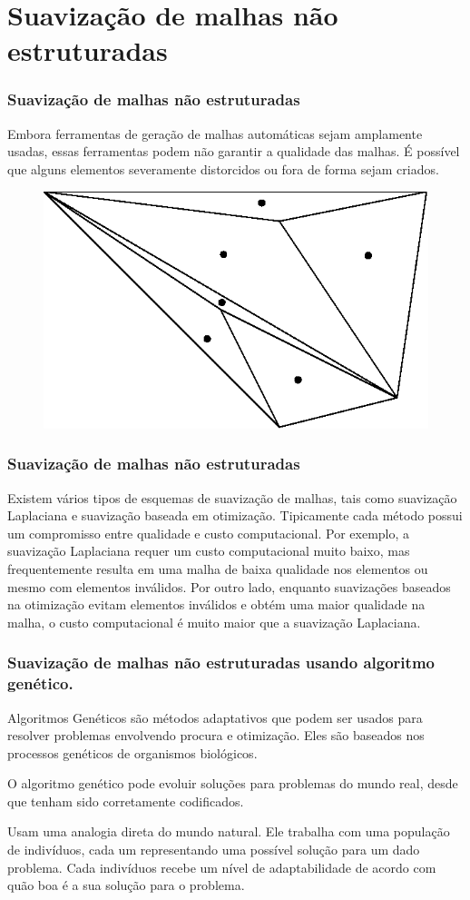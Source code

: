 \documentclass{beamer}
\begin{document}
\section{Suavização de malhas não estruturadas}
\begin{frame}
  \frametitle{Suavização de malhas não estruturadas}
  Embora ferramentas de geração de malhas automáticas sejam amplamente usadas, essas ferramentas podem não garantir a qualidade das malhas. É possível que alguns elementos severamente distorcidos ou fora de forma sejam criados.

  \begin{figure}
    \includegraphics[width=0.4\linewidth]{variacao_brusca.eps}
  \end{figure}
\end{frame}

\begin{frame}
  \frametitle{Suavização de malhas não estruturadas}

  Existem vários tipos de esquemas de suavização de malhas, tais como suavização Laplaciana e suavização baseada em otimização. Tipicamente cada método possui um compromisso entre qualidade e custo computacional. Por exemplo, a suavização Laplaciana requer um custo computacional muito baixo, mas frequentemente resulta em uma malha de baixa qualidade nos elementos ou mesmo com elementos inválidos. Por outro lado, enquanto suavizações baseados na otimização evitam elementos inválidos e obtém uma maior qualidade na malha, o custo computacional é muito maior que a suavização Laplaciana.

\end{frame}

\begin{frame}
  \frametitle{Suavização de malhas não estruturadas usando algoritmo genético.}

  Algoritmos Genéticos são métodos adaptativos que podem ser usados para resolver problemas envolvendo procura e otimização. Eles são baseados nos processos genéticos de organismos biológicos.

  O algoritmo genético pode evoluir soluções para problemas do mundo real, desde que tenham sido corretamente codificados.

  Usam uma analogia direta do mundo natural. Ele trabalha com uma população de indivíduos, cada um representando uma possível solução para um dado problema. Cada indivíduos recebe um nível de adaptabilidade de acordo com quão boa é a sua solução para o problema.

\end{frame}
\end{document}
